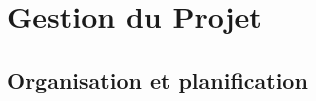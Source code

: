 \documentclass{report}
\begin{document}
\chapter{Gestion du Projet}
\section{Organisation et planification} 

\end{document}

